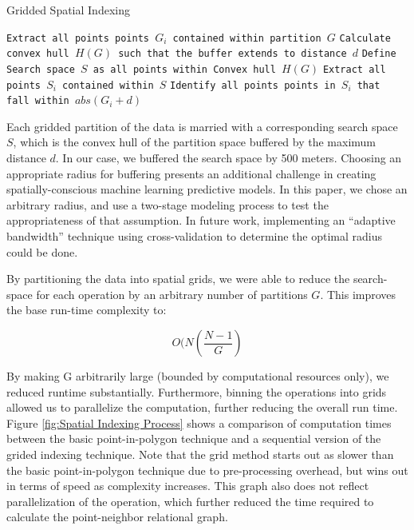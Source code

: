 \documentclass[12pt,]{article}
\begin{document}
\begin{algorithm}
  \caption{Gridded Spatial Indexing}
  \label{alg:spatial1}
  \begin{algorithmic}[1]
        \State \texttt{Extract all points points $G_i$ contained within partition $G$}
        \State \texttt{Calculate convex hull $H(G)$ such that the buffer extends to distance $d$}
        \State \texttt{Define Search space $S$ as all points within Convex hull $H(G)$}
        \State \texttt{Extract all points $S_i$ contained within $S$}
            \State \texttt{Identify all points points in $S_i$ that fall within $abs(G_i+d)$}
        \EndFor
      \EndFor
  \end{algorithmic}
\end{algorithm}

\noindent Each gridded partition of the data is married with a
corresponding search space \(S\), which is the convex hull of the
partition space buffered by the maximum distance \(d\). In our case, we
buffered the search space by 500 meters. Choosing an appropriate radius
for buffering presents an additional challenge in creating
spatially-conscious machine learning predictive models. In this paper,
we chose an arbitrary radius, and use a two-stage modeling process to
test the appropriateness of that assumption. In future work,
implementing an ``adaptive bandwidth'' technique using cross-validation
to determine the optimal radius could be done.

By partitioning the data into spatial grids, we were able to reduce the
search-space for each operation by an arbitrary number of partitions
\(G\). This improves the base run-time complexity to:

\[
O(N(\frac{N-1}{G})
\]

\noindent By making G arbitrarily large (bounded by computational
resources only), we reduced runtime substantially. Furthermore, binning
the operations into grids allowed us to parallelize the computation,
further reducing the overall run time. Figure
\ref{fig:Spatial Indexing Process} shows a comparison of computation
times between the basic point-in-polygon technique and a sequential
version of the grided indexing technique. Note that the grid method
starts out as slower than the basic point-in-polygon technique due to
pre-processing overhead, but wins out in terms of speed as complexity
increases. This graph also does not reflect parallelization of the
operation, which further reduced the time required to calculate the
point-neighbor relational graph.
\end{document}
